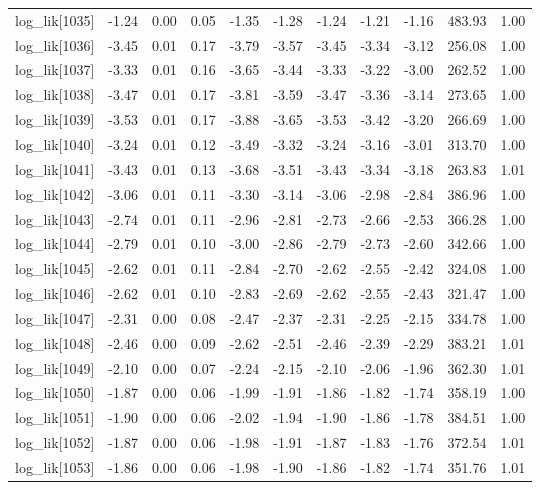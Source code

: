 \begin{table}[ht]
\begin{tabular}{rrrrrrrrrrr}
  log\_lik[1035] & -1.24 & 0.00 & 0.05 & -1.35 & -1.28 & -1.24 & -1.21 & -1.16 & 483.93 & 1.00 \\ 
  log\_lik[1036] & -3.45 & 0.01 & 0.17 & -3.79 & -3.57 & -3.45 & -3.34 & -3.12 & 256.08 & 1.00 \\ 
  log\_lik[1037] & -3.33 & 0.01 & 0.16 & -3.65 & -3.44 & -3.33 & -3.22 & -3.00 & 262.52 & 1.00 \\ 
  log\_lik[1038] & -3.47 & 0.01 & 0.17 & -3.81 & -3.59 & -3.47 & -3.36 & -3.14 & 273.65 & 1.00 \\ 
  log\_lik[1039] & -3.53 & 0.01 & 0.17 & -3.88 & -3.65 & -3.53 & -3.42 & -3.20 & 266.69 & 1.00 \\ 
  log\_lik[1040] & -3.24 & 0.01 & 0.12 & -3.49 & -3.32 & -3.24 & -3.16 & -3.01 & 313.70 & 1.00 \\ 
  log\_lik[1041] & -3.43 & 0.01 & 0.13 & -3.68 & -3.51 & -3.43 & -3.34 & -3.18 & 263.83 & 1.01 \\ 
  log\_lik[1042] & -3.06 & 0.01 & 0.11 & -3.30 & -3.14 & -3.06 & -2.98 & -2.84 & 386.96 & 1.00 \\ 
  log\_lik[1043] & -2.74 & 0.01 & 0.11 & -2.96 & -2.81 & -2.73 & -2.66 & -2.53 & 366.28 & 1.00 \\ 
  log\_lik[1044] & -2.79 & 0.01 & 0.10 & -3.00 & -2.86 & -2.79 & -2.73 & -2.60 & 342.66 & 1.00 \\ 
  log\_lik[1045] & -2.62 & 0.01 & 0.11 & -2.84 & -2.70 & -2.62 & -2.55 & -2.42 & 324.08 & 1.00 \\ 
  log\_lik[1046] & -2.62 & 0.01 & 0.10 & -2.83 & -2.69 & -2.62 & -2.55 & -2.43 & 321.47 & 1.00 \\ 
  log\_lik[1047] & -2.31 & 0.00 & 0.08 & -2.47 & -2.37 & -2.31 & -2.25 & -2.15 & 334.78 & 1.00 \\ 
  log\_lik[1048] & -2.46 & 0.00 & 0.09 & -2.62 & -2.51 & -2.46 & -2.39 & -2.29 & 383.21 & 1.01 \\ 
  log\_lik[1049] & -2.10 & 0.00 & 0.07 & -2.24 & -2.15 & -2.10 & -2.06 & -1.96 & 362.30 & 1.01 \\ 
  log\_lik[1050] & -1.87 & 0.00 & 0.06 & -1.99 & -1.91 & -1.86 & -1.82 & -1.74 & 358.19 & 1.00 \\ 
  log\_lik[1051] & -1.90 & 0.00 & 0.06 & -2.02 & -1.94 & -1.90 & -1.86 & -1.78 & 384.51 & 1.00 \\ 
  log\_lik[1052] & -1.87 & 0.00 & 0.06 & -1.98 & -1.91 & -1.87 & -1.83 & -1.76 & 372.54 & 1.01 \\ 
  log\_lik[1053] & -1.86 & 0.00 & 0.06 & -1.98 & -1.90 & -1.86 & -1.82 & -1.74 & 351.76 & 1.01 \\ 

\end{tabular}
\end{table}
